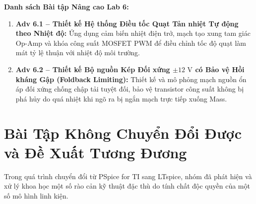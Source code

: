 \documentclass[12pt,a4paper]{report}
\begin{document}
\textbf{Danh sách Bài tập Nâng cao Lab 6:}
\begin{enumerate}
    \item \textbf{Adv 6.1 -- Thiết kế Hệ thống Điều tốc Quạt Tản nhiệt Tự động theo Nhiệt độ:} Ứng dụng cảm biến nhiệt điện trở, mạch tạo xung tam giác Op-Amp và khóa công suất MOSFET PWM để điều chỉnh tốc độ quạt làm mát tỷ lệ thuận với nhiệt độ môi trường.
    \item \textbf{Adv 6.2 -- Thiết kế Bộ nguồn Kép Đối xứng $\pm 12\text{ V}$ có Bảo vệ Hồi kháng Gập (Foldback Limiting):} Thiết kế và mô phỏng mạch nguồn ổn áp đối xứng chống chập tải tuyệt đối, bảo vệ transistor công suất không bị phá hủy do quá nhiệt khi ngõ ra bị ngắn mạch trực tiếp xuống Mass.
\end{enumerate}

\chapter{Bài Tập Không Chuyển Đổi Được và Đề Xuất Tương Đương}

Trong quá trình chuyển đổi từ PSpice for TI sang LTspice, nhóm đã phát hiện và xử lý khoa học một số rào cản kỹ thuật đặc thù do tính chất độc quyền của một số mô hình linh kiện.
\end{document}
